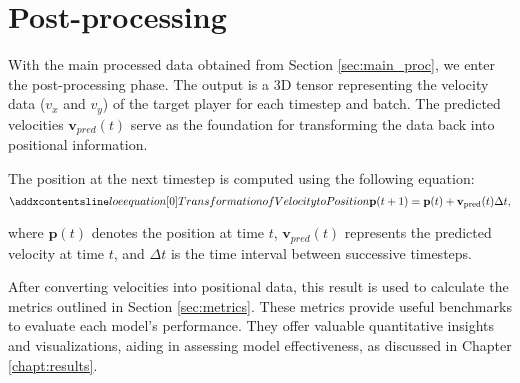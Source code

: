 \section{Post-processing}
\label{sec:postprocessing}

With the main processed data obtained from Section \ref{sec:main_proc}, we enter the post-processing phase. The output is a 3D tensor representing the velocity data (\(v_x\) and \(v_y\)) of the target player for each timestep and batch. The predicted velocities \( \mathbf{v}_{pred}(t) \) serve as the foundation for transforming the data back into positional information.

The position at the next timestep is computed using the following equation:
\begin{equation}
    \setequationentry{Transformation of Velocity to Position}
    \mathbf{p}(t+1) = \mathbf{p}(t) + \mathbf{v}_{\text{pred}}(t) \Delta t,
\end{equation}

where \( \mathbf{p}(t) \) denotes the position at time \( t \), \( \mathbf{v}_{pred}(t) \) represents the predicted velocity at time \( t \), and \( \Delta t \) is the time interval between successive timesteps.

After converting velocities into positional data, this result is used to calculate the metrics outlined in Section \ref{sec:metrics}. These metrics provide useful benchmarks to evaluate each model's performance. They offer valuable quantitative insights and visualizations, aiding in assessing model effectiveness, as discussed in Chapter \ref{chapt:results}.


